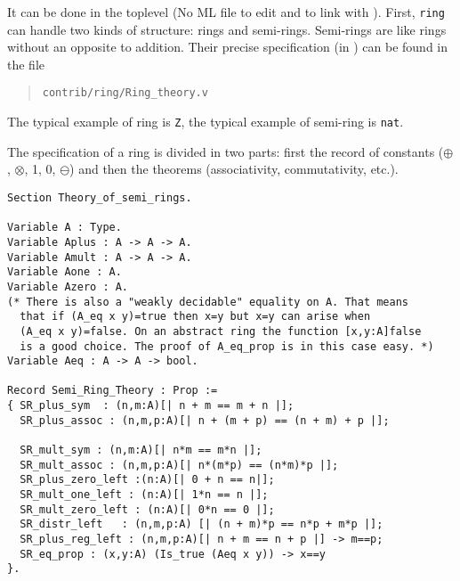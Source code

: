 
It can be done in the \Coq toplevel (No ML file to edit and to link
with \Coq). First, \texttt{ring} can handle two kinds of structure:
rings and semi-rings. Semi-rings are like rings without an opposite to
addition. Their precise specification (in \gallina) can be found in
the file

\begin{quotation}
\begin{verbatim}
contrib/ring/Ring_theory.v
\end{verbatim}
\end{quotation}

The typical example of ring is \texttt{Z}, the typical
example of semi-ring is \texttt{nat}.

The specification of a
ring is divided in two parts: first the record of constants
($\oplus$, $\otimes$, 1, 0, $\ominus$) and then the theorems
(associativity, commutativity, etc.).

\begin{small}
\begin{flushleft}
\begin{verbatim}
Section Theory_of_semi_rings.

Variable A : Type.
Variable Aplus : A -> A -> A.
Variable Amult : A -> A -> A.
Variable Aone : A.
Variable Azero : A.
(* There is also a "weakly decidable" equality on A. That means 
  that if (A_eq x y)=true then x=y but x=y can arise when 
  (A_eq x y)=false. On an abstract ring the function [x,y:A]false
  is a good choice. The proof of A_eq_prop is in this case easy. *)
Variable Aeq : A -> A -> bool.

Record Semi_Ring_Theory : Prop :=
{ SR_plus_sym  : (n,m:A)[| n + m == m + n |];
  SR_plus_assoc : (n,m,p:A)[| n + (m + p) == (n + m) + p |];

  SR_mult_sym : (n,m:A)[| n*m == m*n |];
  SR_mult_assoc : (n,m,p:A)[| n*(m*p) == (n*m)*p |];
  SR_plus_zero_left :(n:A)[| 0 + n == n|];
  SR_mult_one_left : (n:A)[| 1*n == n |];
  SR_mult_zero_left : (n:A)[| 0*n == 0 |];
  SR_distr_left   : (n,m,p:A) [| (n + m)*p == n*p + m*p |];
  SR_plus_reg_left : (n,m,p:A)[| n + m == n + p |] -> m==p;
  SR_eq_prop : (x,y:A) (Is_true (Aeq x y)) -> x==y
}.
\end{verbatim}
\end{flushleft}
\end{small}

